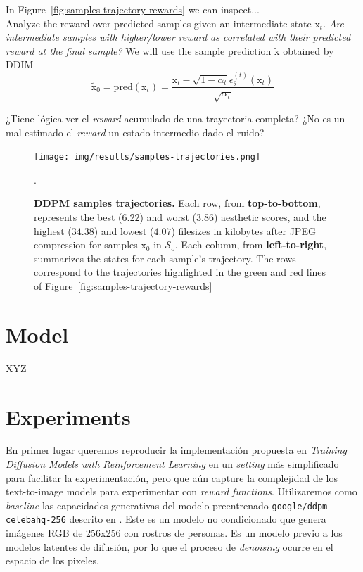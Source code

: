 In Figure~\ref{fig:samples-trajectory-rewards} we can inspect...\\

Analyze the reward over predicted samples given an intermediate
state $\mathrm{x}_{t}$. \textit{Are intermediate samples with higher/lower reward as correlated with their predicted reward at the final sample?} We
will use the sample prediction $\tilde{\mathrm{x}}$ obtained by DDIM
\begin{equation}\label{ddim-predicted-sample}
  \tilde{\mathrm{x}}_{0}=\text{pred}(\mathrm{x}_{t})=\frac{\mathrm{x}_{t}-\sqrt{1-\alpha_{t}}\epsilon_{\theta}^{(t)}(\mathrm{x}_{t})}{\sqrt{\alpha_{t}}}
\end{equation}

¿Tiene lógica ver el \textit{reward} acumulado de una trayectoria completa?
¿No es un mal estimado el \textit{reward} un estado intermedio dado el ruido?

\begin{figure}[ht]
  \centering
  \texttt{[image: img/results/samples-trajectories.png]}
  \vspace{-18pt}  %
    \captionsetup{width=\textwidth} %
    \caption{\textbf{DDPM samples trajectories.} Each row, from \textbf{top-to-bottom}, represents the best ($6.22$)
  and worst ($3.86$) aesthetic scores, and the highest ($34.38$) and lowest 
  ($4.07$) filesizes in kilobytes after JPEG compression for samples
  $\mathrm{x}_{0}$ in $\mathcal{S}_{o}$. Each column, from \textbf{left-to-right}, summarizes the
  states for each sample's trajectory. The rows correspond to the trajectories
  highlighted in the green and red lines of Figure~\ref{fig:samples-trajectory-rewards}}.
    \label{fig:sample-trajectories}
\end{figure}

\section{Model}

XYZ

\section{Experiments}

En primer lugar queremos reproducir la implementación propuesta en \textit{Training Diffusion Models with Reinforcement Learning} \cite{black2023training} en un \textit{setting} más simplificado para facilitar
la experimentación, pero que aún capture la complejidad de los text-to-image models para experimentar con \textit{reward functions}. Utilizaremos como \textit{baseline} las capacidades generativas del modelo preentrenado \texttt{google/ddpm-celebahq-256} descrito en \cite{ho2020denoising}. Este es un modelo no condicionado que genera imágenes RGB de 256x256 con rostros de personas. Es un modelo previo a los modelos latentes de difusión, por lo que el proceso de \textit{denoising} ocurre en el espacio de los pixeles. \\






